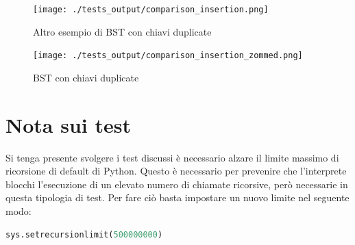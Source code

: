 \documentclass{article}
\begin{document}
\begin{minipage}[t]{\linewidth}

\begin{multicols}{2}

\begin{minipage}{\linewidth}
    \centering
    \label{tab:bst-flag-insertion-summarised}
\end{minipage}

\columnbreak

\begin{minipage}{\linewidth}
    \centering
    \label{tab:bst-list-insertion-summarised}
\end{minipage}

\end{multicols}

\end{minipage}



\begin{figure}[htbp]
 \begin{minipage}{0.5\textwidth}
    \centering
    \texttt{[image: ./tests\_output/comparison\_insertion.png]}
    \caption{Altro esempio di BST con chiavi duplicate}
    \label{fig:comparison_insertion}
  \end{minipage}
  \begin{minipage}{0.5\textwidth}
    \centering
    \texttt{[image: ./tests\_output/comparison\_insertion\_zommed.png]}
    \caption{BST con chiavi duplicate}
    \label{fig:comparison_insertion_zommed}
  \end{minipage}%
\end{figure}



\newpage

\section*{Nota sui test}


Si tenga presente svolgere i test discussi è necessario alzare il limite massimo di ricorsione di default di Python. Questo è necessario per prevenire che l'interprete blocchi l'esecuzione di un elevato numero di chiamate ricorsive, però necessarie in questa tipologia di test.
Per fare ciò basta impostare un nuovo limite nel seguente modo:
\begin{lstlisting}[language=Python]
sys.setrecursionlimit(500000000)
\end{lstlisting}
\end{document}
